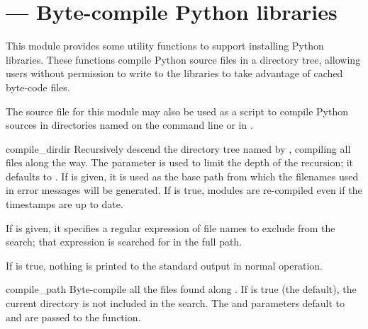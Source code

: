 \section{ ---
         Byte-compile Python libraries}



This module provides some utility functions to support installing
Python libraries.  These functions compile Python source files in a
directory tree, allowing users without permission to write to the
libraries to take advantage of cached byte-code files.

The source file for this module may also be used as a script to
compile Python sources in directories named on the command line or in
.


\begin{funcdesc}{compile_dir}{dir}
  Recursively descend the directory tree named by , compiling
  all  files along the way.  The  parameter
  is used to limit the depth of the recursion; it defaults to
  .  If  is given, it is used as the base path from 
  which the filenames used in error messages will be generated.  If
   is true, modules are re-compiled even if the timestamps
  are up to date. 

  If  is given, it specifies a regular expression of file
  names to exclude from the search; that expression is searched for in
  the full path.

  If  is true, nothing is printed to the standard output
  in normal operation.
\end{funcdesc}

\begin{funcdesc}{compile_path}{}
  Byte-compile all the  files found along .
  If  is true (the default), the current directory is
  not included in the search.  The  and
   parameters default to  and are passed to the
   function.
\end{funcdesc}


\begin{seealso}
\end{seealso}
